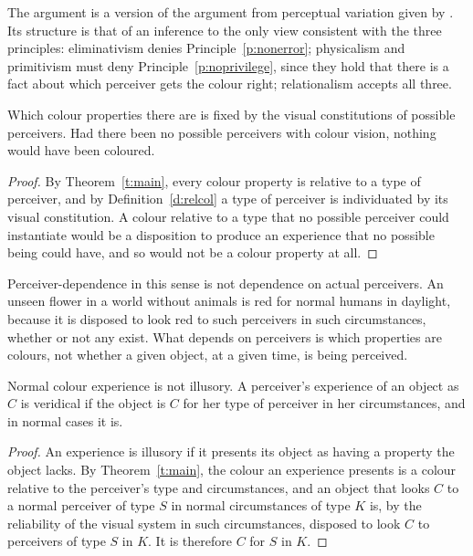 \documentclass{situationist-preprint}
\begin{document}
The argument is a version of the argument from perceptual variation given by \citet{Cohen2009}. Its structure is that of an inference to the only view consistent with the three principles: eliminativism denies Principle~\ref{p:nonerror}; physicalism and primitivism must deny Principle~\ref{p:noprivilege}, since they hold that there is a fact about which perceiver gets the colour right; relationalism accepts all three.

\begin{proposition}\label{p:dependence}
Which colour properties there are is fixed by the visual constitutions of possible perceivers. Had there been no possible perceivers with colour vision, nothing would have been coloured.
\end{proposition}

\begin{proof}
By Theorem~\ref{t:main}, every colour property is relative to a type of perceiver, and by Definition~\ref{d:relcol} a type of perceiver is individuated by its visual constitution. A colour relative to a type that no possible perceiver could instantiate would be a disposition to produce an experience that no possible being could have, and so would not be a colour property at all.
\end{proof}

Perceiver-dependence in this sense is not dependence on actual perceivers. An unseen flower in a world without animals is red for normal humans in daylight, because it is disposed to look red to such perceivers in such circumstances, whether or not any exist. What depends on perceivers is which properties are colours, not whether a given object, at a given time, is being perceived.

\begin{corollary}\label{c:veridical}
Normal colour experience is not illusory. A perceiver's experience of an object as $C$ is veridical if the object is $C$ for her type of perceiver in her circumstances, and in normal cases it is.
\end{corollary}

\begin{proof}
An experience is illusory if it presents its object as having a property the object lacks. By Theorem~\ref{t:main}, the colour an experience presents is a colour relative to the perceiver's type and circumstances, and an object that looks $C$ to a normal perceiver of type $S$ in normal circumstances of type $K$ is, by the reliability of the visual system in such circumstances, disposed to look $C$ to perceivers of type $S$ in $K$. It is therefore $C$ for $S$ in $K$.
\end{proof}
\end{document}
